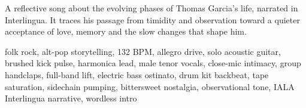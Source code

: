 
\label{sec:le-phases-de-thomas}

\begin{notes}
A reflective song about the evolving phases of Thomas Garcia’s life, narrated in Interlingua. %
It traces his passage from timidity and observation toward a quieter acceptance of love, memory and the slow changes that shape him.
\end{notes}

\begin{style}
folk rock, alt-pop storytelling, 132 BPM, allegro drive, solo acoustic guitar, brushed kick pulse, harmonica lead, male tenor vocals, close-mic intimacy, group handclaps, full-band lift, electric bass ostinato, drum kit backbeat, tape saturation, sidechain pumping, bittersweet nostalgia, observational tone, IALA Interlingua narrative, wordless intro
\end{style}

